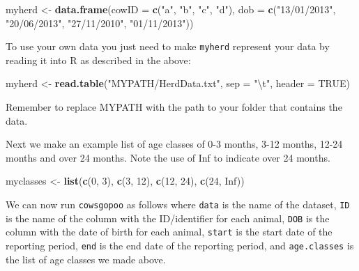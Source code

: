 \documentclass[12pt]{article}
\newcommand{\KeywordTok}[1]{\textcolor[rgb]{0.13,0.29,0.53}{\textbf{{#1}}}}
\newcommand{\DataTypeTok}[1]{\textcolor[rgb]{0.13,0.29,0.53}{{#1}}}
\newcommand{\DecValTok}[1]{\textcolor[rgb]{0.00,0.00,0.81}{{#1}}}
\newcommand{\CharTok}[1]{\textcolor[rgb]{0.31,0.60,0.02}{{#1}}}
\newcommand{\StringTok}[1]{\textcolor[rgb]{0.31,0.60,0.02}{{#1}}}
\newcommand{\OtherTok}[1]{\textcolor[rgb]{0.56,0.35,0.01}{{#1}}}
\newcommand{\NormalTok}[1]{{#1}}
\begin{document}
\begin{snugshade}
\begin{Highlighting}[]
\NormalTok{myherd <-}\StringTok{ }\KeywordTok{data.frame}\NormalTok{(}\DataTypeTok{cowID =} \KeywordTok{c}\NormalTok{(}\StringTok{"a", "b", "c", "d"}\NormalTok{), }
           \DataTypeTok{dob =} \KeywordTok{c}\NormalTok{(}\StringTok{"13/01/2013", "20/06/2013", "27/11/2010", "01/11/2013"}\NormalTok{))}
\end{Highlighting}
\end{snugshade}                   

\begin{framed}
To use your own data you just need to make \texttt{myherd} represent your data by reading it into R as described in the above: 
\begin{snugshade}
\begin{Highlighting}[]
\NormalTok{myherd <-}\StringTok{ }\KeywordTok{read.table}\NormalTok{(}\StringTok{"MYPATH/HerdData.txt"}\NormalTok{, }\DataTypeTok{sep =} \StringTok{"}\CharTok{\textbackslash{}t}\StringTok{"}\NormalTok{, }\DataTypeTok{header =} \OtherTok{TRUE}\NormalTok{)}
\end{Highlighting}
\end{snugshade}
Remember to replace MYPATH with the path to your folder that contains the data.
\end{framed}

Next we make an example list of age classes of 0-3 months, 3-12 months, 12-24 months and over 24 months. 
Note the use of Inf to indicate over 24 months.

\begin{snugshade}
\begin{Highlighting}[]
\NormalTok{myclasses <-}\StringTok{ }\KeywordTok{list}\NormalTok{(}\KeywordTok{c}\NormalTok{(}\DecValTok{0}\NormalTok{,} \DecValTok{3}\NormalTok{),} \KeywordTok{c}\NormalTok{(}\DecValTok{3}\NormalTok{,} \DecValTok{12}\NormalTok{),} \KeywordTok{c}\NormalTok{(}\DecValTok{12}\NormalTok{,} \DecValTok{24}\NormalTok{),} \KeywordTok{c}\NormalTok{(}\DecValTok{24}\NormalTok{,} \CharTok{Inf}\NormalTok{))}
\end{Highlighting}
\end{snugshade}

We can now run \texttt{cowsgopoo} as follows where \texttt{data} is the name of the dataset, \texttt{ID} is the name of the column with the ID/identifier for each animal, \texttt{DOB} is the column with the date of birth for each animal, \texttt{start} is the start date of the reporting period, \texttt{end} is the end date of the reporting period, and \texttt{age.classes} is the list of age classes we made above.
\end{document}
